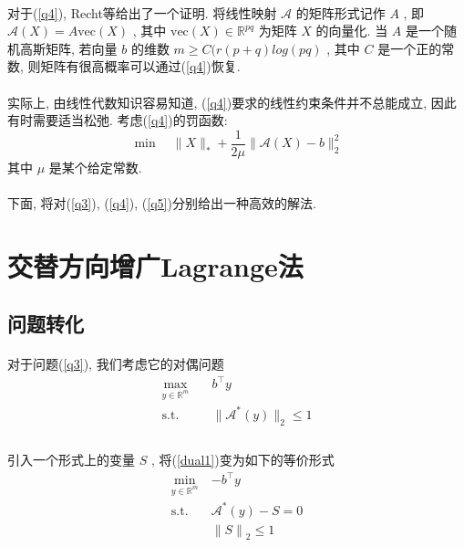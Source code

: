 \documentclass[UTF8]{ctexart}
\begin{document}
			\paragraph{}
				\quad 对于(\ref{q4}), Recht等给出了一个证明. 将线性映射 $\mathcal{A}$ 的矩阵形式记作 $A$ , 即 $\mathcal{A}(X) = A\text{vec}(X)$ , 其中 $\text{vec}(X) \in \mathbb{R}^{pq}$ 为矩阵 $X$ 的向量化. 当 $A$ 是一个随机高斯矩阵, 若向量 $b$ 的维数 $m \ge C(r(p + q)log(pq)$ , 其中 $C$ 是一个正的常数, 则矩阵有很高概率可以通过(\ref{q4})恢复.

			\paragraph{}
				\quad 实际上, 由线性代数知识容易知道, (\ref{q4})要求的线性约束条件并不总能成立, 因此有时需要适当松弛. 考虑(\ref{q4})的罚函数:
				\begin{equation}\label{q5}
					\min \quad \lVert{X}\rVert_*+ \frac{1}{2\mu} \lVert{\mathcal{A}(X) - b}\rVert_2^2
				\end{equation}
				其中 $\mu$ 是某个给定常数.

			\paragraph{}
				\quad 下面, 将对(\ref{q3}), (\ref{q4}), (\ref{q5})分别给出一种高效的解法.

	\section{交替方向增广Lagrange法}
		\subsection{问题转化}
			\paragraph{}
				\quad 对于问题(\ref{q3}), 我们考虑它的对偶问题
				\begin{equation}
					\begin{split}\label{dual1}
						\max_{y \in \mathbb{R}^{m}} \quad
							& b^\top y\\
						\text{s.t.} \quad
							& \lVert{\mathcal{A}^*(y)}\rVert_2 \le 1\\
					\end{split}
				\end{equation}

			\paragraph{}
				\quad 引入一个形式上的变量 $S$ , 将(\ref{dual1})变为如下的等价形式
				\begin{equation}
					\begin{split}\label{dual2}
						\min_{y \in \mathbb{R}^{m}}
							& -b^\top y\\
						\text{s.t.} \quad
							& \mathcal{A}^*(y) - S = 0\\
							& {\lVert{S}\rVert}_2 \le 1\\
					\end{split}
				\end{equation}
\end{document}
